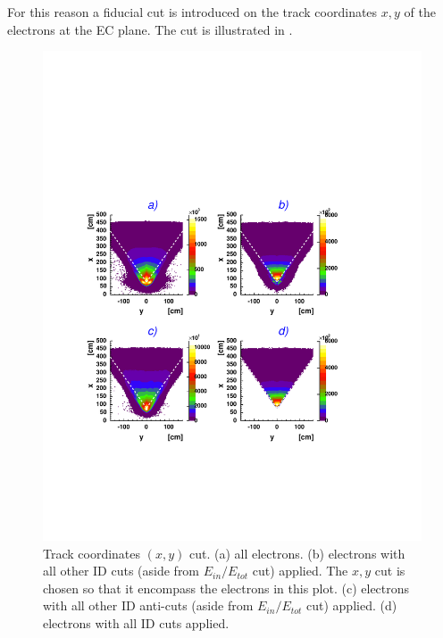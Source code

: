 For this reason a fiducial cut is introduced on the track coordinates $x,y$ of the electrons 
at the EC plane. The cut is illustrated in .

\begin{figure}[h]
\begin{center}
  \includegraphics[width=12cm, bb=60 120 490 580]{data_reduction/img/ec4_pid}
  \caption[Track coordinates $(x,y)$ cut ]
          { Track coordinates $(x, y)$ cut. 
	             (a) all electrons.
		     (b) electrons with all other ID cuts (aside from $E_{in}/E_{tot}$ cut) applied. 
		     The $x,y$ cut is chosen so that it encompass the electrons in this plot.
       	      	     (c) electrons with all other ID 
		     anti-cuts (aside from $E_{in}/E_{tot}$  cut) applied. 		      
                     (d) electrons with all ID cuts applied.}	  	             
 \label{fig:ec4cut}
  \end{center}
\end{figure}














